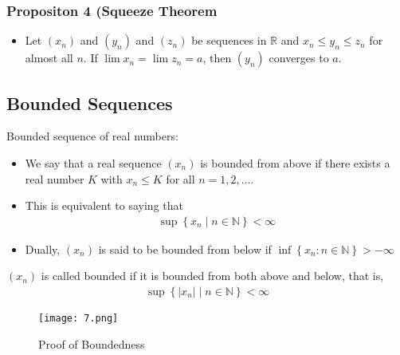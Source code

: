 \documentclass[12pt,a4paper]{article}
\begin{document}
  \subsubsection*{Propositon 4 (Squeeze Theorem} 
  \begin{itemize}
    \item Let \(\left(x_n\right)\) and \(\left(y_n\right)\) and \(\left(z_n\right)\) be sequences in \(\mathbb{R}\) and \(x_n \leq y_n \leq z_n\) for almost all \(n\). If \(\lim x_n=\lim z_n=a\), then \(\left(y_n\right)\) converges to \(a\).
  \end{itemize}

 \subsection{Bounded Sequences} 
 Bounded sequence of real numbers:
\begin{itemize}
    \item We say that a real sequence \(\left(x_n\right)\) is bounded from above if there exists a real number \(K\) with \(x_n \leq K\) for all \(n=1,2, \ldots \).
    \item This is equivalent to saying that
    \begin{align*}
        \sup \left\{x_n \mid n \in \mathbb{N}\right\}<\infty
    \end{align*}
    \item Dually, \(\left(x_n\right)\) is said to be bounded from below if \(\inf \left\{ x_n: n \in \mathbb{N}\right\}>-\infty \)
\end{itemize}
\begin{tcolorbox}
    \(\left(x_n\right)\) is called bounded if it is bounded from both above and below, that is,
\begin{align*}
\sup \left\{\left|x_n\right| \mid n \in \mathbb{N}\right\}<\infty
\end{align*}
\end{tcolorbox}
\begin{figure}[ht]
    \centering
    \texttt{[image: 7.png]}
    \caption{Proof of Boundedness}
\end{figure}
\end{document}
